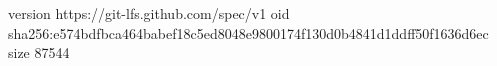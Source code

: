 version https://git-lfs.github.com/spec/v1
oid sha256:e574bdfbca464babef18c5ed8048e9800174f130d0b4841d1ddff50f1636d6ec
size 87544
